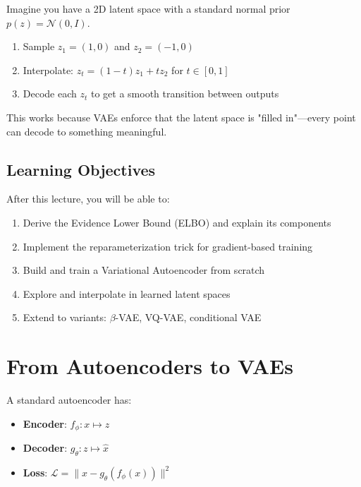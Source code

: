 Imagine you have a 2D latent space with a standard normal prior $p(z) = \mathcal{N}(0, I)$.

\begin{enumerate}
    \item Sample $z_1 = (1, 0)$ and $z_2 = (-1, 0)$
    \item Interpolate: $z_t = (1-t) z_1 + t z_2$ for $t \in [0, 1]$
    \item Decode each $z_t$ to get a smooth transition between outputs
\end{enumerate}

This works because VAEs enforce that the latent space is "filled in"---every point can decode to something meaningful.

\subsection{Learning Objectives}

After this lecture, you will be able to:
\begin{enumerate}
    \item Derive the Evidence Lower Bound (ELBO) and explain its components
    \item Implement the reparameterization trick for gradient-based training
    \item Build and train a Variational Autoencoder from scratch
    \item Explore and interpolate in learned latent spaces
    \item Extend to variants: $\beta$-VAE, VQ-VAE, conditional VAE
\end{enumerate}


\section{From Autoencoders to VAEs}


A standard autoencoder has:
\begin{itemize}
    \item \textbf{Encoder}: $f_\phi: x \mapsto z$
    \item \textbf{Decoder}: $g_\theta: z \mapsto \hat{x}$
    \item \textbf{Loss}: $\mathcal{L} = \|x - g_\theta(f_\phi(x))\|^2$
\end{itemize}

